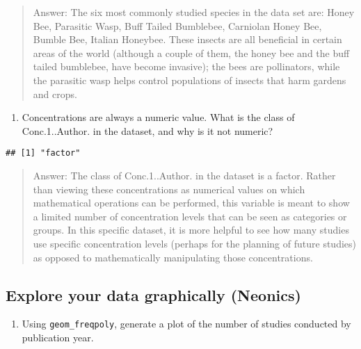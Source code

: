 \documentclass[]{article}
\newenvironment{Shaded}{\begin{snugshade}}{\end{snugshade}}
\newcommand{\CommentTok}[1]{\textcolor[rgb]{0.56,0.35,0.01}{\textit{#1}}}
\newcommand{\DecValTok}[1]{\textcolor[rgb]{0.00,0.00,0.81}{#1}}
\newcommand{\KeywordTok}[1]{\textcolor[rgb]{0.13,0.29,0.53}{\textbf{#1}}}
\newcommand{\NormalTok}[1]{#1}
\newcommand{\OperatorTok}[1]{\textcolor[rgb]{0.81,0.36,0.00}{\textbf{#1}}}
\providecommand{\tightlist}{%
  \setlength{\itemsep}{0pt}\setlength{\parskip}{0pt}}
\begin{document}
\begin{quote}
Answer: The six most commonly studied species in the data set are: Honey
Bee, Parasitic Wasp, Buff Tailed Bumblebee, Carniolan Honey Bee, Bumble
Bee, Italian Honeybee. These insects are all beneficial in certain areas
of the world (although a couple of them, the honey bee and the buff
tailed bumblebee, have become invasive); the bees are pollinators, while
the parasitic wasp helps control populations of insects that harm
gardens and crops.
\end{quote}

\begin{enumerate}
\def\labelenumi{\arabic{enumi}.}
\setcounter{enumi}{7}
\tightlist
\item
  Concentrations are always a numeric value. What is the class of
  Conc.1..Author. in the dataset, and why is it not numeric?
\end{enumerate}

\begin{Shaded}
\end{Shaded}

\begin{verbatim}
## [1] "factor"
\end{verbatim}

\begin{quote}
Answer: The class of Conc.1..Author. in the dataset is a factor. Rather
than viewing these concentrations as numerical values on which
mathematical operations can be performed, this variable is meant to show
a limited number of concentration levels that can be seen as categories
or groups. In this specific dataset, it is more helpful to see how many
studies use specific concentration levels (perhaps for the planning of
future studies) as opposed to mathematically manipulating those
concentrations.
\end{quote}

\hypertarget{explore-your-data-graphically-neonics}{%
\subsection{Explore your data graphically
(Neonics)}\label{explore-your-data-graphically-neonics}}

\begin{enumerate}
\def\labelenumi{\arabic{enumi}.}
\setcounter{enumi}{8}
\tightlist
\item
  Using \texttt{geom\_freqpoly}, generate a plot of the number of
  studies conducted by publication year.
\end{enumerate}
\end{document}
